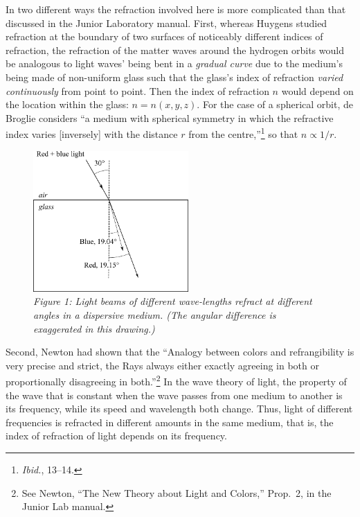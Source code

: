 In two different ways the refraction involved here is more complicated
than that discussed in the Junior Laboratory manual. First, whereas
Huygens studied refraction at the boundary of two surfaces of noticeably
different indices of refraction, the refraction of the matter waves
around the hydrogen orbits would be analogous to light waves' being bent
in a \emph{gradual curve} due to the medium's being made of
non-uniform glass such that the glass's index of refraction
\emph{varied continuously} from point to point. Then the index of
refraction $n$ would depend on the location within the glass:
$n = n(x,y,z)$. For the case of a spherical orbit, de
Broglie considers ``a medium with spherical symmetry in which the
refractive index varies {[}inversely{]} with the distance $r$ from
the centre,''\footnote{\emph{Ibid.}, 13--14.} so that $n \propto 1/r$.

\begin{figure} %
  \begin{center}
    \includegraphics[width=2.338in,height=2.117in]{images/08_debroglie/refraction.png}
    \caption*{\emph{Figure 1: Light beams of different wave-lengths refract at different
    angles in a dispersive medium. (The angular difference is exaggerated in
    this drawing.)}}
  \end{center}
\end{figure}


Second, Newton had shown that the ``Analogy between colors and
refrangibility is very precise and strict, the Rays always either exactly agreeing
in both or proportionally disagreeing in both.''\footnote{See Newton,
``The New Theory about Light and Colors,'' Prop.\ 2, in the Junior Lab manual.} 
In the wave theory of light, the property of the wave that is
constant when the wave passes from one medium to another is its
frequency, while its speed and wavelength both change. Thus, light of
different frequencies is refracted in different amounts in the same
medium, that is, the index of refraction of light depends on its
frequency.



